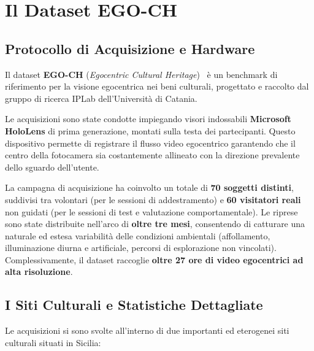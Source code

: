 \documentclass[a4paper,12pt]{report}
\begin{document}
\chapter{Il Dataset EGO-CH}

\section{Protocollo di Acquisizione e Hardware}

Il dataset \textbf{EGO-CH} (\emph{Egocentric Cultural Heritage})~\cite{egoref} è un benchmark di riferimento per la visione egocentrica nei beni culturali, progettato e raccolto dal gruppo di ricerca IPLab dell'Università di Catania.

Le acquisizioni sono state condotte impiegando visori indossabili \textbf{Microsoft HoloLens} di prima generazione, montati sulla testa dei partecipanti. Questo dispositivo permette di registrare il flusso video egocentrico garantendo che il centro della fotocamera sia costantemente allineato con la direzione prevalente dello sguardo dell'utente.

La campagna di acquisizione ha coinvolto un totale di \textbf{70 soggetti distinti}, suddivisi tra volontari (per le sessioni di addestramento) e \textbf{60 visitatori reali} non guidati (per le sessioni di test e valutazione comportamentale). Le riprese sono state distribuite nell'arco di \textbf{oltre tre mesi}, consentendo di catturare una naturale ed estesa variabilità delle condizioni ambientali (affollamento, illuminazione diurna e artificiale, percorsi di esplorazione non vincolati). Complessivamente, il dataset raccoglie \textbf{oltre 27 ore di video egocentrici ad alta risoluzione}.

\section{I Siti Culturali e Statistiche Dettagliate}

Le acquisizioni si sono svolte all'interno di due importanti ed eterogenei siti culturali situati in Sicilia:
\end{document}
